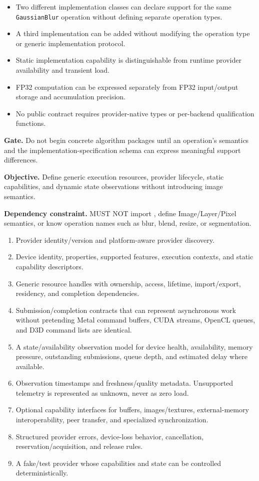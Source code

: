 \exitcriteria
\begin{itemize}
  \item Two different implementation classes can declare support for the same \texttt{GaussianBlur} operation without defining separate operation types.
  \item A third implementation can be added without modifying the operation type or generic implementation protocol.
  \item Static implementation capability is distinguishable from runtime provider availability and transient load.
  \item FP32 computation can be expressed separately from FP32 input/output storage and accumulation precision.
  \item No public contract requires provider-native types or per-backend qualification functions.
\end{itemize}

\textbf{Gate.} Do not begin concrete algorithm packages until an operation's semantics and the implementation-specification schema can express meaningful support differences.


\textbf{Objective.} Define generic execution resources, provider lifecycle, static capabilities, and dynamic state observations without introducing image semantics.

\textbf{Dependency constraint.} \GEP{} MUST NOT import \IPP{}, define Image/Layer/Pixel semantics, or know operation names such as blur, blend, resize, or segmentation.

\deliverables
\begin{enumerate}
  \item Provider identity/version and platform-aware provider discovery.
  \item Device identity, properties, supported features, execution contexts, and static capability descriptors.
  \item Generic resource handles with ownership, access, lifetime, import/export, residency, and completion dependencies.
  \item Submission/completion contracts that can represent asynchronous work without pretending Metal command buffers, CUDA streams, OpenCL queues, and D3D command lists are identical.
  \item A state/availability observation model for device health, availability, memory pressure, outstanding submissions, queue depth, and estimated delay where available.
  \item Observation timestamps and freshness/quality metadata. Unsupported telemetry is represented as unknown, never as zero load.
  \item Optional capability interfaces for buffers, images/textures, external-memory interoperability, peer transfer, and specialized synchronization.
  \item Structured provider errors, device-loss behavior, cancellation, reservation/acquisition, and release rules.
  \item A fake/test provider whose capabilities and state can be controlled deterministically.
\end{enumerate}

